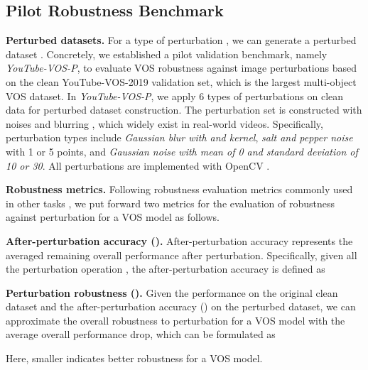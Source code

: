 \documentclass[sigconf]{acmart}
\begin{document}
\subsection{Pilot Robustness Benchmark}
\label{sec:robustness_benchmark}
\noindent\textbf{Perturbed datasets.}
For a type of perturbation , we can generate a perturbed dataset . Concretely, we established a pilot validation benchmark, namely \textit{YouTube-VOS-P}, to evaluate VOS robustness against image perturbations based on the clean YouTube-VOS-2019 \cite{xu2018youtube} validation set, which is the largest multi-object VOS dataset. In \textit{YouTube-VOS-P}, we apply 6 types of perturbations on clean data for perturbed dataset construction. The perturbation set is constructed with noises \cite{deledalle2012compare} and blurring \cite{liu2020estimating}, which widely exist in real-world videos. Specifically, perturbation types include \textit{Gaussian blur with  and  kernel}, \textit{salt and pepper noise} with 1 or 5 points, and \textit{Gaussian noise with mean of 0 and standard deviation of 10 or 30}. All perturbations are implemented with OpenCV \cite{bradski2008learning}.

\noindent\textbf{Robustness metrics.} 
Following robustness evaluation metrics commonly used in other tasks \cite{hendrycks2019benchmarking,kamann2020benchmarking,laugros2019adversarial,tramer2019adversarial,jin2019bert}, we put forward two metrics for the evaluation of robustness against perturbation for a VOS model as follows.

\noindent\textbf{After-perturbation accuracy ().} After-perturbation accuracy  represents the averaged remaining overall performance after perturbation. Specifically, given all the perturbation operation , the after-perturbation accuracy is defined as

\noindent\textbf{Perturbation robustness ().} Given the performance  on the original clean dataset and the after-perturbation accuracy () on the perturbed dataset, we can approximate the overall robustness to perturbation  for a VOS model with the average overall performance drop, which can be formulated as 

Here, smaller  indicates better robustness for a VOS model. 
\end{document}
